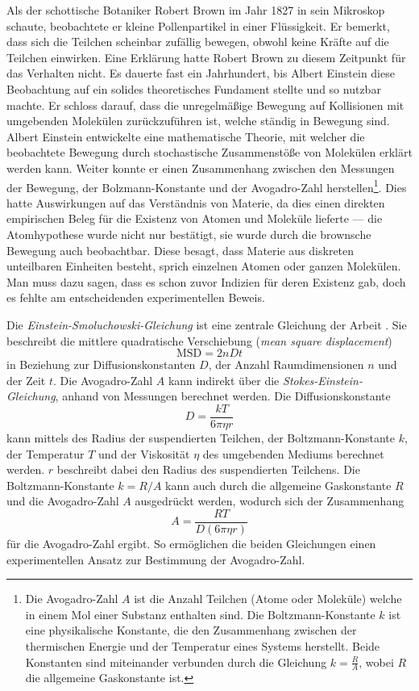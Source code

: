 Als der schottische Botaniker Robert Brown im Jahr 1827 in sein Mikroskop schaute, beobachtete er kleine Pollenpartikel in einer Flüssigkeit. Er bemerkt, dass sich die Teilchen scheinbar zufällig bewegen, obwohl keine Kräfte auf die Teilchen einwirken. Eine Erklärung hatte Robert Brown zu diesem Zeitpunkt für das Verhalten nicht. Es dauerte fast ein Jahrhundert, bis Albert Einstein diese Beobachtung auf ein solides theoretisches Fundament stellte und so nutzbar machte. Er schloss darauf, dass die unregelmäßige Bewegung auf Kollisionen mit umgebenden Molekülen zurückzuführen ist, welche ständig in Bewegung sind. Albert Einstein entwickelte eine mathematische Theorie, mit welcher die beobachtete Bewegung durch stochastische Zusammenstöße von Molekülen erklärt werden kann. Weiter konnte er einen Zusammenhang zwischen den Messungen der Bewegung, der Bolzmann-Konstante und der  Avogadro-Zahl herstellen\footnote{Die Avogadro-Zahl $ A $ ist die Anzahl Teilchen (Atome oder Moleküle) welche in einem Mol einer Substanz enthalten sind. Die Boltzmann-Konstante $ k $ ist eine physikalische Konstante, die den Zusammenhang zwischen der thermischen Energie und der Temperatur eines Systems herstellt. Beide Konstanten sind miteinander verbunden durch die Gleichung $ k = \frac{R}{A} $, wobei $ R $ die allgemeine Gaskonstante ist.}. Dies hatte Auswirkungen auf das Verständnis von Materie, da dies einen direkten empirischen Beleg für die Existenz von Atomen und Moleküle lieferte --- die Atomhypothese wurde nicht nur bestätigt, sie wurde durch die brownsche Bewegung auch beobachtbar. Diese besagt, dass Materie aus diskreten unteilbaren Einheiten besteht, sprich einzelnen Atomen oder ganzen Molekülen. Man muss dazu sagen, dass es schon zuvor Indizien für deren Existenz gab, doch es fehlte am entscheidenden experimentellen Beweis.


Die \textit{Einstein-Smoluchowski-Gleichung} ist eine zentrale Gleichung der Arbeit \cite{einstein1922untersuchungen}. Sie beschreibt die mittlere quadratische Verschiebung (\textit{mean square displacement})
\begin{equation}
	\mathrm{MSD} = 2nDt
\end{equation}
in Beziehung zur Diffusionskonstanten $ D $, der Anzahl Raumdimensionen $ n $ und der Zeit $ t $. Die Avogadro-Zahl $ A $ kann indirekt über die \textit{Stokes-Einstein-Gleichung}, anhand von Messungen berechnet werden. Die Diffusionskonstante
\begin{equation}
	D = \frac{kT}{6\pi\eta r}
\end{equation}
kann mittels des Radius der suspendierten Teilchen, der Boltzmann-Konstante  $ k $, der Temperatur $ T $ und der Viskosität $ \eta $ des umgebenden Mediums berechnet werden. $ r $ beschreibt dabei den Radius des suspendierten Teilchens. Die Boltzmann-Konstante  $ k = R/A $ kann auch durch die allgemeine Gaskonstante $ R $ und die Avogadro-Zahl $ A $ ausgedrückt werden, wodurch sich der Zusammenhang
\begin{equation}
	A = \frac{R T}{D (6 \pi \eta r)}
\end{equation}
für die Avogadro-Zahl ergibt. So ermöglichen die beiden Gleichungen einen experimentellen Ansatz zur Bestimmung der Avogadro-Zahl.


